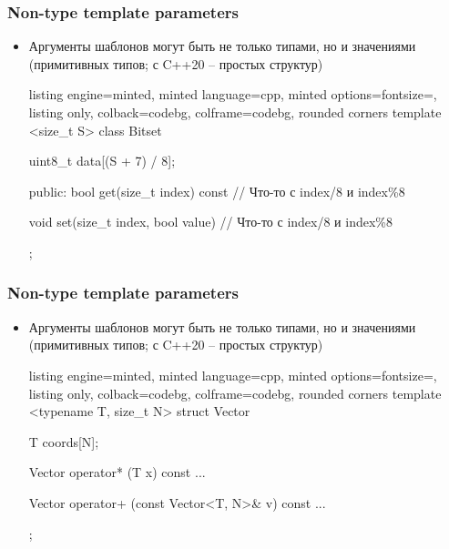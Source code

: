 \documentclass[10pt]{beamer}
\begin{document}
\begin{frame}[fragile]
\frametitle{Non-type template parameters}
\begin{itemize}
\item Аргументы шаблонов могут быть не только типами, но и значениями (примитивных типов; с C++20 -- простых структур)
\begin{tcblisting}{listing engine=minted, minted language=cpp, minted options={fontsize=\scriptsize}, listing only, colback=codebg, colframe=codebg, rounded corners}
template <size_t S>
class Bitset {
  uint8_t data[(S + 7) / 8];

public:
  bool get(size_t index) const {
    // Что-то с index/8 и index\%8
  }

  void set(size_t index, bool value) {
    // Что-то с index/8 и index\%8
  }
};
\end{tcblisting}
\end{itemize}
\end{frame}

\begin{frame}[fragile]
\frametitle{Non-type template parameters}
\begin{itemize}
\item Аргументы шаблонов могут быть не только типами, но и значениями (примитивных типов; с C++20 -- простых структур)
\begin{tcblisting}{listing engine=minted, minted language=cpp, minted options={fontsize=\scriptsize}, listing only, colback=codebg, colframe=codebg, rounded corners}
template <typename T, size_t N>
struct Vector {
  T coords[N];

  Vector operator* (T x) const {
    ...
  }

  Vector operator+ (const Vector<T, N>& v) const {
    ...
  }
};
\end{tcblisting}
\end{itemize}
\end{frame}
\end{document}
